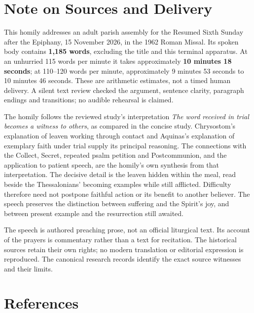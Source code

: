 \section{Note on Sources and Delivery}

This homily addresses an adult parish assembly for the Resumed Sixth Sunday after the Epiphany, 15 November 2026, in the 1962 Roman Missal. Its spoken body contains \textbf{1,185 words}, excluding the title and this terminal apparatus. At an unhurried 115 words per minute it takes approximately \textbf{10 minutes 18 seconds}; at 110--120 words per minute, approximately 9 minutes 53 seconds to 10 minutes 46 seconds. These are arithmetic estimates, not a timed human delivery. A silent text review checked the argument, sentence clarity, paragraph endings and transitions; no audible rehearsal is claimed.

The homily follows the reviewed study's interpretation \textit{The word received in trial becomes a witness to others}, as compared in the concise study. Chrysostom's explanation of leaven working through contact and Aquinas's explanation of exemplary faith under trial supply its principal reasoning. The connections with the Collect, Secret, repeated psalm petition and Postcommunion, and the application to patient speech, are the homily's own synthesis from that interpretation. The decisive detail is the leaven hidden within the meal, read beside the Thessalonians' becoming examples while still afflicted. Difficulty therefore need not postpone faithful action or its benefit to another believer. The speech preserves the distinction between suffering and the Spirit's joy, and between present example and the resurrection still awaited.

The speech is authored preaching prose, not an official liturgical text. Its account of the prayers is commentary rather than a text for recitation. The historical sources retain their own rights; no modern translation or editorial expression is reproduced. The canonical research records identify the exact source witnesses and their limits.

\section{References}

